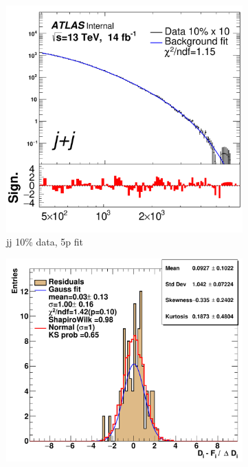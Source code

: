 \begin{figure}[H]
    \centering
    \begin{subfigure}[h]{0.38\linewidth}
    \includegraphics[scale=0.3]{figs/app/10data/pub_mass_10per_extrapolate_jj.pdf}%
    \caption{jj 10\% data, 5p fit }
    \end{subfigure}
    \hfill
    \begin{subfigure}[h]{0.4\linewidth}
    \includegraphics[scale=0.32]{figs/app/10data/pub_mass_10per_extrapolate_residuals_jj.pdf}%

\end{subfigure}
\end{figure}
